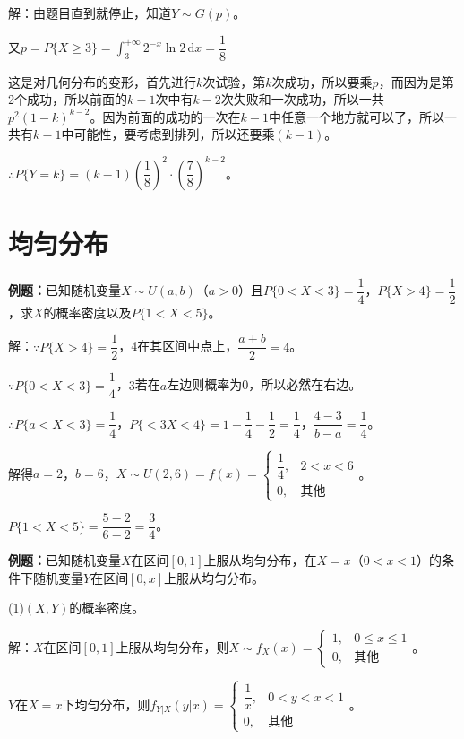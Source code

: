 \documentclass[UTF8, 12pt]{ctexart}
\begin{document}
解：由题目直到就停止，知道$Y\sim G(p)$。

又$p=P\{X\geqslant3\}=\int_3^{+\infty}2^{-x}\ln2\,\textrm{d}x=\dfrac{1}{8}$

这是对几何分布的变形，首先进行$k$次试验，第$k$次成功，所以要乘$p$，而因为是第2个成功，所以前面的$k-1$次中有$k-2$次失败和一次成功，所以一共$p^2(1-k)^{k-2}$。因为前面的成功的一次在$k-1$中任意一个地方就可以了，所以一共有$k-1$中可能性，要考虑到排列，所以还要乘$(k-1)$。

$\therefore P\{Y=k\}=(k-1)\left(\dfrac{1}{8}\right)^2\cdot\left(\dfrac{7}{8}\right)^{k-2}$。

\section{均匀分布}

\textbf{例题：}已知随机变量$X\sim U(a,b)$（$a>0$）且$P\{0<X<3\}=\dfrac{1}{4}$，$P\{X>4\}=\dfrac{1}{2}$，求$X$的概率密度以及$P\{1<X<5\}$。

解：$\because P\{X>4\}=\dfrac{1}{2}$，4在其区间中点上，$\dfrac{a+b}{2}=4$。

$\because P\{0<X<3\}=\dfrac{1}{4}$，$3$若在$a$左边则概率为0，所以必然在右边。

$\therefore P\{a<X<3\}=\dfrac{1}{4}$，$P\{<3X<4\}=1-\dfrac{1}{4}-\dfrac{1}{2}=\dfrac{1}{4}$，$\dfrac{4-3}{b-a}=\dfrac{1}{4}$。

解得$a=2$，$b=6$，$X\sim U(2,6)=f(x)=\left\{\begin{array}{ll}
    \dfrac{1}{4}, & 2<x<6 \\
    0, & \text{其他}
\end{array}\right.$。

$P\{1<X<5\}=\dfrac{5-2}{6-2}=\dfrac{3}{4}$。

\textbf{例题：}已知随机变量$X$在区间$[0,1]$上服从均匀分布，在$X=x$（$0<x<1$）的条件下随机变量$Y$在区间$[0,x]$上服从均匀分布。

(1)$(X,Y)$的概率密度。

解：$X$在区间$[0,1]$上服从均匀分布，则$X\sim f_X(x)=\left\{\begin{array}{ll}
    1, & 0\leqslant x\leqslant1 \\
    0, & \text{其他}
\end{array}\right.$。

$Y$在$X=x$下均匀分布，则$f_{Y|X}(y|x)=\left\{\begin{array}{ll}
    \dfrac{1}{x}, & 0<y<x<1 \\
    0, & \text{其他}
\end{array}\right.$。
\end{document}
